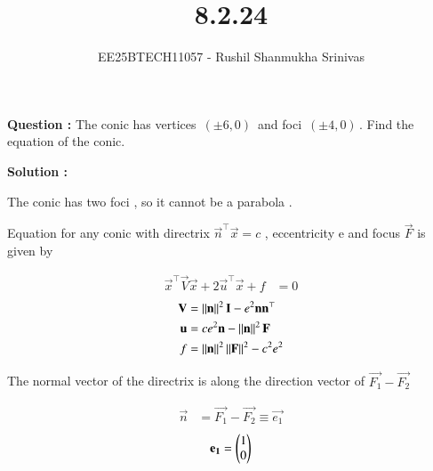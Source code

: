 \documentclass[journal]{IEEEtran}
\begin{document}


\title{8.2.24}
\author{EE25BTECH11057 - Rushil Shanmukha Srinivas
}
{\let\newpage\relax\maketitle}

\renewcommand{\thefigure}{\theenumi}
\renewcommand{\thetable}{\theenumi}
\setlength{\intextsep}{10pt} %

\renewcommand{\thetable}{\theenumi}
\textbf{Question :} The conic has vertices $\,(\pm 6,0)\,$ and foci $\,(\pm 4,0)\,$. Find the equation of the conic.

\textbf{Solution :} 

\begin{table}[h!]
  \centering
  
  \caption*{Table : Ellipse}
  \label{8.2.23}
\end{table}

The conic has two foci , so it cannot be a parabola .

Equation for any conic with directrix $\vec{n}^\top\vec{x} = c$ , eccentricity e and focus $\vec{F}$ is given by 

\begin{align}
  \vec{x}^\top\vec{V}\vec{x} + 2\vec{u}^\top\vec{x} + f &= 0  \label{eq:conic}
\end{align}
\begin{align}
  \mathbf{V} &= \left\lVert\mathbf{n}\right\rVert^2\mathbf{I} - e^2\mathbf{n}\mathbf{n}^\top \label{eq:matrixV} \\
  \mathbf{u} &= ce^2\mathbf{n} - \left\lVert\mathbf{n}\right\rVert^2\mathbf{F} \label{eq:matrixu} \\
  f &= \left\lVert\mathbf{n}\right\rVert^2\left\lVert\mathbf{F}\right\rVert^2 - c^2e^2 \label{eq:f}
\end{align}

The normal vector of the directrix is along the direction vector of $\vec{F_1} - \vec{F_2}$

\begin{align}
  \vec{n} &= \vec{F_1} - \vec{F_2} \equiv \vec{e_1}
\end{align}
\begin{align}
\mathbf{e_1} = \begin{pmatrix}1\\0\end{pmatrix}
\end{align}
\pagebreak
\end{document}
